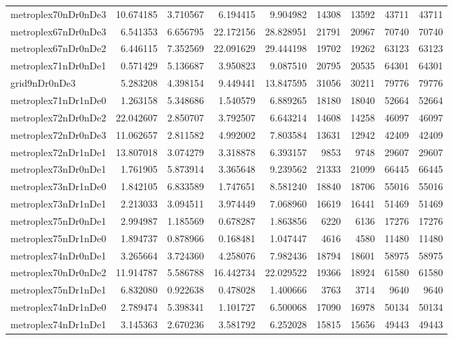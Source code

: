 \begin{longtable}{|l|r|r|r|r|r|r|r|r|}
metroplex70nDr0nDe3 & 10.674185 & 3.710567 & 6.194415 & 9.904982 & 14308 & 13592 & 43711 & 43711 \\
metroplex67nDr0nDe3 & 6.541353 & 6.656795 & 22.172156 & 28.828951 & 21791 & 20967 & 70740 & 70740 \\
metroplex67nDr0nDe2 & 6.446115 & 7.352569 & 22.091629 & 29.444198 & 19702 & 19262 & 63123 & 63123 \\
metroplex71nDr0nDe1 & 0.571429 & 5.136687 & 3.950823 & 9.087510 & 20795 & 20535 & 64301 & 64301 \\
grid9nDr0nDe3 & 5.283208 & 4.398154 & 9.449441 & 13.847595 & 31056 & 30211 & 79776 & 79776 \\
metroplex71nDr1nDe0 & 1.263158 & 5.348686 & 1.540579 & 6.889265 & 18180 & 18040 & 52664 & 52664 \\
metroplex72nDr0nDe2 & 22.042607 & 2.850707 & 3.792507 & 6.643214 & 14608 & 14258 & 46097 & 46097 \\
metroplex72nDr0nDe3 & 11.062657 & 2.811582 & 4.992002 & 7.803584 & 13631 & 12942 & 42409 & 42409 \\
metroplex72nDr1nDe1 & 13.807018 & 3.074279 & 3.318878 & 6.393157 & 9853 & 9748 & 29607 & 29607 \\
metroplex73nDr0nDe1 & 1.761905 & 5.873914 & 3.365648 & 9.239562 & 21333 & 21099 & 66445 & 66445 \\
metroplex73nDr1nDe0 & 1.842105 & 6.833589 & 1.747651 & 8.581240 & 18840 & 18706 & 55016 & 55016 \\
metroplex73nDr1nDe1 & 2.213033 & 3.094511 & 3.974449 & 7.068960 & 16619 & 16441 & 51469 & 51469 \\
metroplex75nDr0nDe1 & 2.994987 & 1.185569 & 0.678287 & 1.863856 & 6220 & 6136 & 17276 & 17276 \\
metroplex75nDr1nDe0 & 1.894737 & 0.878966 & 0.168481 & 1.047447 & 4616 & 4580 & 11480 & 11480 \\
metroplex74nDr0nDe1 & 3.265664 & 3.724360 & 4.258076 & 7.982436 & 18794 & 18601 & 58975 & 58975 \\
metroplex70nDr0nDe2 & 11.914787 & 5.586788 & 16.442734 & 22.029522 & 19366 & 18924 & 61580 & 61580 \\
metroplex75nDr1nDe1 & 6.832080 & 0.922638 & 0.478028 & 1.400666 & 3763 & 3714 & 9640 & 9640 \\
metroplex74nDr1nDe0 & 2.789474 & 5.398341 & 1.101727 & 6.500068 & 17090 & 16978 & 50134 & 50134 \\
metroplex74nDr1nDe1 & 3.145363 & 2.670236 & 3.581792 & 6.252028 & 15815 & 15656 & 49443 & 49443 \\

\end{longtable}

